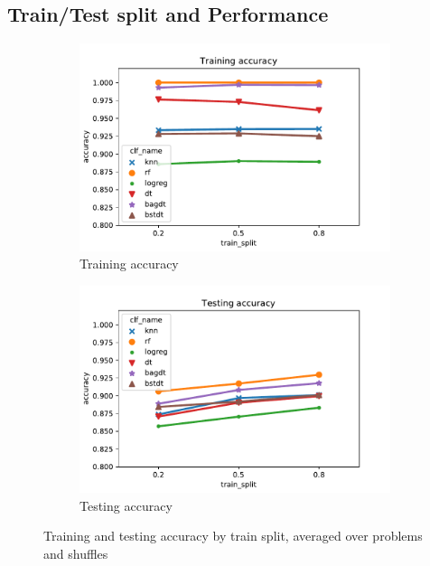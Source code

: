\documentclass[twoside,11pt]{article}
\begin{document}
		\subsection{Train/Test split and Performance}
			\begin{figure}[h]
				\begin{subfigure}{.5\textwidth}
					\includegraphics[width=\textwidth]{tr_acc_by_clf_trainsplit}
					\caption{Training accuracy}
					\label{fig:perf_by_trainsplit_tr}
				\end{subfigure}
				\begin{subfigure}{.5\textwidth}
					\includegraphics[width=\textwidth]{te_acc_by_clf_trainsplit}
					\caption{Testing accuracy}
					\label{fig:perf_by_trainsplit_te}
				\end{subfigure}
			\caption{Training and testing accuracy by train split, averaged over problems and shuffles}
			\label{fig:perf_by_trainsplit}
			\end{figure}
		
\end{document}
